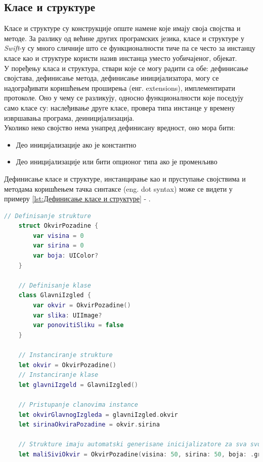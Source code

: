 \documentclass[12pt,oneside]{memoir}
\begin{document}
\subsection{Класе и структуре}

\indent Класе и структуре су конструкције опште намене које имају своја својства и методе. За разлику од већине других програмских језика, класе и структуре у \textit{Swift}-у су много сличније што се функционалности тиче па се често за инстанцу класе као и структуре користи назив инстанца уместо уобичајеног, објекат. 
\\
\indent У поређењу класа и структура, ствари које се могу радити са обе: дефинисање својстава, дефинисање метода, дефинисање иницијализатора, могу се надограђивати коришћењем проширења (енг. extensions), имплементирати протоколе. 
Оно у чему се разликују, односно функционалности које поседују само класе су: наслеђивање друге класе, провера типа инстанце у времену извршавања програма, деиницијализација.
\\
\indent Уколико неко својство нема унапред дефинисану вредност, оно мора бити: 
\begin{itemize}
    \item Део иницијализације ако је константно 
    \item Део иницијализације или бити опционог типа ако је променљиво 
\end{itemize}
Дефинисање класе и структуре, инстанцирање као и пруступање својствима и методама коришћењем тачка синтаксе (eng. dot syntax) може се видети у примеру \ref{lst:Дефинисање класе и структуре} - .

\begin{lstlisting}[caption=\textit{{Дефинисање класе и структуре}}, label={lst:Дефинисање класе и структуре}, language=Swift, frame=single]
    // Definisanje strukture
    struct OkvirPozadine {
        var visina = 0
        var sirina = 0
        var boja: UIColor?
    }
    
    // Definisanje klase
    class GlavniIzgled {
        var okvir = OkvirPozadine()
        var slika: UIImage?
        var ponovitiSliku = false
    }
    
    // Instanciranje strukture
    let okvir = OkvirPozadine()
    // Instanciranje klase
    let glavniIzgeld = GlavniIzgled()
    
    // Pristupanje clanovima instance
    let okvirGlavnogIzgleda = glavniIzgled.okvir
    let sirinaOkviraPozadine = okvir.sirina
    
    // Strukture imaju automatski generisane inicijalizatore za sva svojstva
    let maliSiviOkvir = OkvirPozadine(visina: 50, sirina: 50, boja: .gray)
\end{lstlisting}
\end{document}
